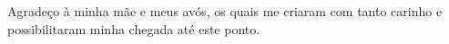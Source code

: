 \begin{agradecimentos}

Agradeço à minha mãe e meus avós, os quais me criaram com tanto carinho e possibilitaram minha chegada até este ponto.

\end{agradecimentos}
